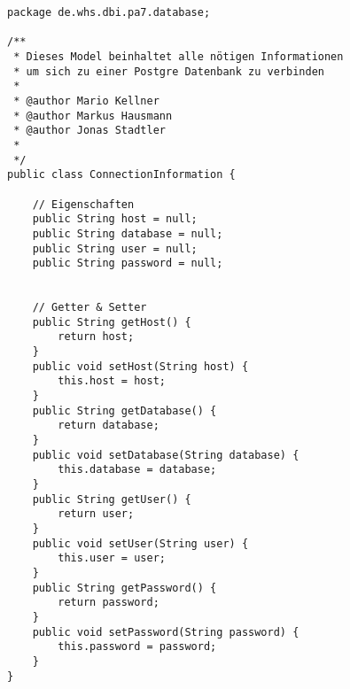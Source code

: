 \begin{lstlisting}[caption={ConnectionInformation (optimiert)}, label={lst:civ2}]
package de.whs.dbi.pa7.database;

/**
 * Dieses Model beinhaltet alle nötigen Informationen 
 * um sich zu einer Postgre Datenbank zu verbinden
 * 
 * @author Mario Kellner
 * @author Markus Hausmann
 * @author Jonas Stadtler
 *
 */
public class ConnectionInformation {
	
	// Eigenschaften
	public String host = null;
	public String database = null;
	public String user = null;
	public String password = null;
	
	
	// Getter & Setter
	public String getHost() {
		return host;
	}
	public void setHost(String host) {
		this.host = host;
	}
	public String getDatabase() {
		return database;
	}
	public void setDatabase(String database) {
		this.database = database;
	}
	public String getUser() {
		return user;
	}
	public void setUser(String user) {
		this.user = user;
	}
	public String getPassword() {
		return password;
	}
	public void setPassword(String password) {
		this.password = password;
	}
}
\end{lstlisting}

